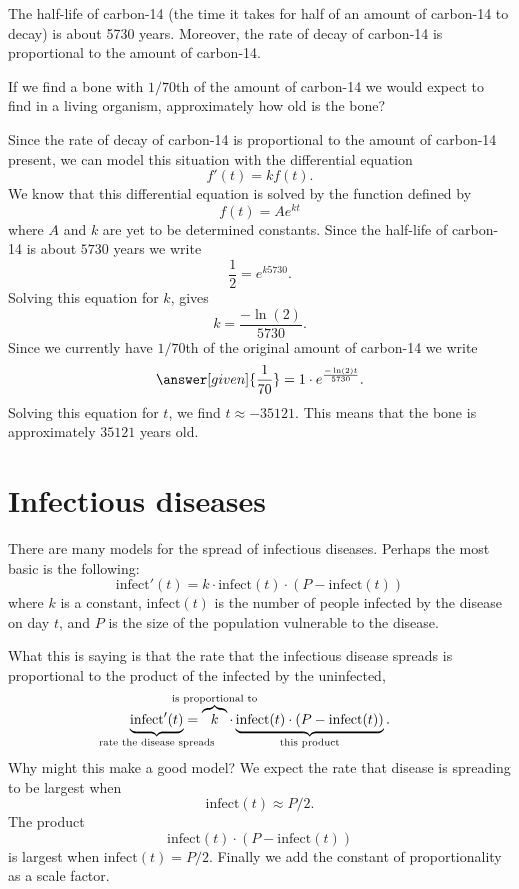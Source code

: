 \documentclass{ximera}
\begin{document}
\begin{example}
The half-life of carbon-14 (the time it takes for half of an amount of
carbon-14 to decay) is about 5730 years. Moreover, the rate of decay
of carbon-14 is proportional to the amount of carbon-14.

If we find a bone with $1/70$th of the amount of carbon-14 we would
expect to find in a living organism, approximately how old is the
bone?

\begin{explanation}
Since the rate of decay of carbon-14 is proportional to the amount of
carbon-14 present, we can model this situation with the differential
equation
\[
f'(t) = k f(t).
\]
We know that this differential equation is solved by the function
defined by
\[
f(t) = A e^{kt}
\]
where $A$ and $k$ are yet to be determined constants. Since the
half-life of carbon-14 is about $5730$ years we write
\[
\frac{1}{2} = e^{k 5730}.
\]
Solving this equation for $k$, gives
\[
k = \frac{-\ln(2)}{5730}.
\]
Since we currently have $1/70$th of the original amount of carbon-14
we write
\[
\answer[given]{\frac{1}{70}} = 1\cdot e^{\frac{-\ln(2)t}{5730}}.
\]
Solving this equation for $t$, we find $t \approx -35121$. This means
that the bone is approximately $35121$ years old.
\end{explanation}
\end{example}




\section{Infectious diseases}

There are many models for the spread of infectious diseases. Perhaps
the most basic is the following:
\[
\mathrm{infect}'(t) = k\cdot \mathrm{infect}(t)\cdot(P-\mathrm{infect}(t))
\]
where $k$ is a constant, $\mathrm{infect}(t)$ is the number of people
infected by the disease on day $t$, and $P$ is the size of the
population vulnerable to the disease.

What this is saying is that the rate that the infectious disease
spreads is proportional to the product of the infected by the
uninfected,
\[
\underbrace{\mathrm{infect}'(t)}_{\mathclap{\text{rate the disease
spreads}}} = \overbrace{k}^{\mathclap{\text{is proportional to}}} \cdot \underbrace{\mathrm{infect}(t)\cdot(P-\mathrm{infect}(t))}_{\mathclap{\text{this product}}}.
\]
Why might this make a good model? We expect the rate that
disease is spreading to be largest when
\[
\mathrm{infect}(t) \approx P/2.
\]
The product
\[
\mathrm{infect}(t)\cdot (P-\mathrm{infect}(t))
\]
is largest when $\mathrm{infect}(t) = P/2$. Finally we add the constant
of proportionality as a scale factor.
\end{document}
